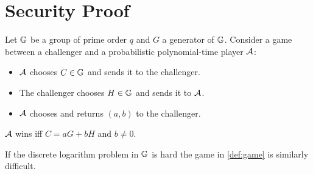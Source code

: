 \clearpage


\section{Security Proof}
\label{proof}

\begin{definition}\label{def:game}
	Let $\mathbb G$ be a group of prime order $q$ and $G$ a generator of $\mathbb G$.
	Consider a game between a challenger and a probabilistic polynomial-time player $\mathcal A$:
	\begin{itemize}
		\item $\mathcal A$ chooses $C \in \mathbb G$ and sends it to the challenger.
		\item The challenger chooses $H \in \mathbb G$ and sends it to $\mathcal A$.
		\item $\mathcal A$ chooses and returns $(a, b)$ to the challenger.
	\end{itemize}
	$\mathcal A$ wins iff $C = aG + bH$ and $b \ne 0$.
\end{definition}

\begin{lemma}\label{lemma:game}
	If the discrete logarithm problem in $\mathbb G$ is hard the game in \cref{def:game} is similarly difficult.
\end{lemma}

